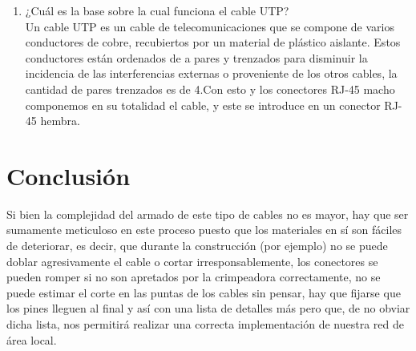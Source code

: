 \documentclass{article}
\begin{document}
\begin{enumerate}
\item¿Cuál es la base sobre la cual funciona el cable UTP?\\
\newline Un cable UTP es un cable de telecomunicaciones que se compone de varios conductores de cobre, recubiertos por un material de plástico aislante. Estos conductores están ordenados de a pares y trenzados para disminuir la incidencia de las interferencias externas o proveniente de los otros cables, la cantidad de pares trenzados es de 4.Con esto y los conectores RJ-45 macho componemos en su totalidad el cable, y este se introduce en un conector RJ-45 hembra.
\end{enumerate}
\newpage

\section{Conclusión \vspace{0.5cm}}
Si bien la complejidad del armado de este tipo de cables no es mayor, hay que ser sumamente meticuloso en este proceso puesto que los materiales en sí son fáciles de deteriorar, es decir, que durante la construcción (por ejemplo) no se puede doblar agresivamente el cable o cortar irresponsablemente, los conectores se pueden romper si no son apretados por la crimpeadora correctamente, no se puede estimar el corte en las puntas de los cables sin pensar, hay que fijarse que los pines lleguen al final y así con una lista de detalles más pero que, de no obviar dicha lista, nos permitirá realizar una correcta implementación de nuestra red de área local.
\end{document}
